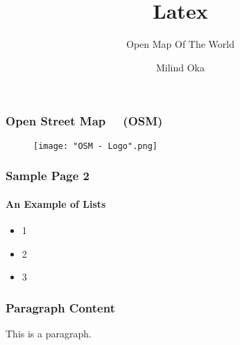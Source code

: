 \documentclass{beamer}
\title{Latex}
\subtitle{Open Map Of The World}
\author{Milind Oka}
\begin{document}
	\frame 
	{
		\titlepage
	}
	
	
	\frame 
	{
		\frametitle{Open Street Map \ \  (OSM) }
		\begin{figure}
    \texttt{[image: "OSM - Logo".png]}
\end{figure}	
		}
	
	
	\frame
	{
		
		\frametitle{Sample Page 2}
		\framesubtitle{An Example of Lists}
		\begin{itemize}
			\item 1
			\item 2
			\item 3
		\end{itemize}
		
	}
	
	\begin{frame}
	    \frametitle{Paragraph Content}
	    This is a paragraph.
	 \end{frame}
	 
	 
\end{document}
